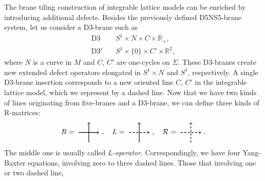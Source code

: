 The brane tiling construction of integrable lattice models can be
enriched by introducing additional defects. Besides the previously
defined D5NS5-brane system, let us consider a D3-brane such as
\begin{align}
  \mathrm{D3}    &  \quad S^{1}  \times  N  \times  C  \times  \mathbb{R}_{+}, \label{eq:D3}\\
  \mathrm{D3'}   &  \quad S^{1}  \times \{ 0\}  \times  C'  \times  \mathbb{R}^{2}, \label{eq:D3'}
\end{align}
where $N$ is a curve in $M$ and $C,\,C'$ are one-cycles on $\Sigma$.
These D3-branes create new extended defect operators elongated in $S^1\times N$ and $S^1$, respectively.
A single D3-brane insertion corresponds to a new oriented line $C,\,C'$ in
the integrable lattice model, which we represent by a dashed line.
Now that we have two kinds of lines originating from five-branes and a D3-brane,
we can define three kinds of R-matrices:
\begin{equation}
  R=
    \begin{tikzpicture}[scale=0.5, baseline=(x.base)]
        \node (x) at (0,0) {\vphantom{x}};

        \draw[thick, ->] (0,0) -- (2,0);
        \draw[thick, ->] (1,-1) -- (1,1);

    \end{tikzpicture}
  ~ ,
  \quad
  L=
    \begin{tikzpicture}[scale=0.5, baseline=(x.base)]
        \node (x) at (0,0) {\vphantom{x}};

        \draw[thick, densely dashed, ->] (0,0) -- (2,0);
        \draw[thick, ->] (1,-1) -- (1,1);

    \end{tikzpicture}
  ~ ,
  \quad
  \mathcal{R}=
    \begin{tikzpicture}[scale=0.5, baseline=(x.base)]
        \node (x) at (0,0) {\vphantom{x}};

        \draw[thick, densely dashed, ->] (0,0) -- (2,0);
        \draw[thick, densely dashed, ->] (1,-1) -- (1,1);

    \end{tikzpicture}
  ~ .
\end{equation}
The middle one is usually called \emph{L-operator}. Correspondingly,
we have four Yang-Baxter equations, involving zero to three dashed
lines. Those that involving one or two dashed line,
